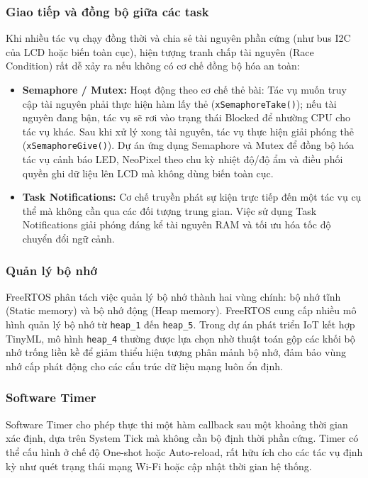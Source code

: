 \subsubsection{Giao tiếp và đồng bộ giữa các task}
Khi nhiều tác vụ chạy đồng thời và chia sẻ tài nguyên phần cứng (như bus I2C của LCD hoặc biến toàn cục), hiện tượng tranh chấp tài nguyên (Race Condition) rất dễ xảy ra nếu không có cơ chế đồng bộ hóa an toàn:
\begin{itemize}
    \item \textbf{Semaphore / Mutex:} Hoạt động theo cơ chế thẻ bài: Tác vụ muốn truy cập tài nguyên phải thực hiện hàm lấy thẻ (\texttt{xSemaphoreTake()}); nếu tài nguyên đang bận, tác vụ sẽ rơi vào trạng thái Blocked để nhường CPU cho tác vụ khác. Sau khi xử lý xong tài nguyên, tác vụ thực hiện giải phóng thẻ (\texttt{xSemaphoreGive()}). Dự án ứng dụng Semaphore và Mutex để đồng bộ hóa tác vụ cảnh báo LED, NeoPixel theo chu kỳ nhiệt độ/độ ẩm và điều phối quyền ghi dữ liệu lên LCD mà không dùng biến toàn cục.
    \item \textbf{Task Notifications:} Cơ chế truyền phát sự kiện trực tiếp đến một tác vụ cụ thể mà không cần qua các đối tượng trung gian. Việc sử dụng Task Notifications giải phóng đáng kể tài nguyên RAM và tối ưu hóa tốc độ chuyển đổi ngữ cảnh.
\end{itemize}

\subsubsection{Quản lý bộ nhớ}
FreeRTOS phân tách việc quản lý bộ nhớ thành hai vùng chính: bộ nhớ tĩnh (Static memory) và bộ nhớ động (Heap memory). FreeRTOS cung cấp nhiều mô hình quản lý bộ nhớ từ \texttt{heap\_1} đến \texttt{heap\_5}. Trong dự án phát triển IoT kết hợp TinyML, mô hình \texttt{heap\_4} thường được lựa chọn nhờ thuật toán gộp các khối bộ nhớ trống liền kề để giảm thiểu hiện tượng phân mảnh bộ nhớ, đảm bảo vùng nhớ cấp phát động cho các cấu trúc dữ liệu mạng luôn ổn định.

\subsubsection{Software Timer}
Software Timer cho phép thực thi một hàm callback sau một khoảng thời gian xác định, dựa trên System Tick mà không cần bộ định thời phần cứng. Timer có thể cấu hình ở chế độ One-shot hoặc Auto-reload, rất hữu ích cho các tác vụ định kỳ như quét trạng thái mạng Wi-Fi hoặc cập nhật thời gian hệ thống.

